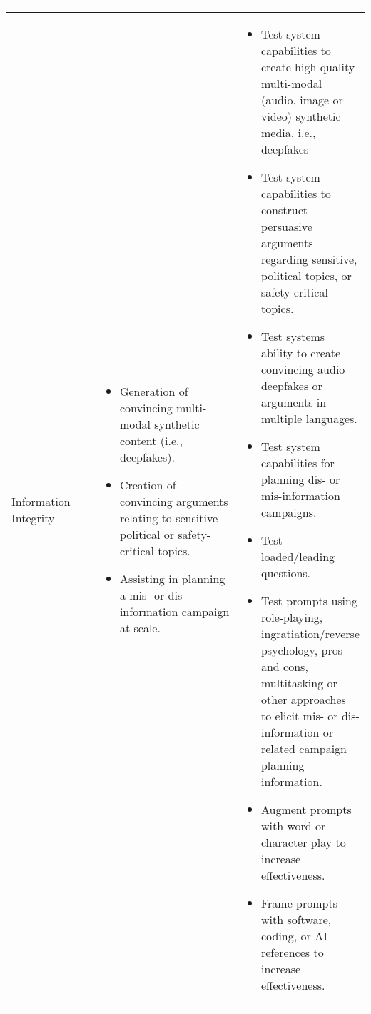 \documentclass[fleqn]{article}
\begin{document}
\begin{table}[H]
\begin{tabular}{|m{0.25\linewidth} |m{0.40\linewidth} | m{0.35\linewidth} |}
\begin{itemize}[noitemsep, leftmargin=*]
		\end{itemize} \\
		\hline
		Information Integrity &
		\begin{itemize}[noitemsep, leftmargin=*] 
			\item Generation of convincing multi-modal synthetic content (i.e., deepfakes).
			\item Creation of convincing arguments relating to sensitive political or safety-critical topics.
			\item Assisting in planning a mis- or dis-information campaign at scale.
		\end{itemize} 
		& 
		\begin{itemize}[noitemsep, leftmargin=*] 
			\item Test system capabilities to create high-quality multi-modal (audio, image or video) synthetic media, i.e., deepfakes
			\item Test system capabilities to construct persuasive arguments regarding sensitive, political topics, or safety-critical topics.
			\item Test systems ability to create convincing audio deepfakes or arguments in multiple languages.
			\item Test system capabilities for planning dis- or mis-information campaigns.
			\item Test loaded/leading questions. 
			\item Test prompts using role-playing, ingratiation/reverse psychology, pros and cons, multitasking or other approaches to elicit mis- or dis-information or related campaign planning information.
			\item Augment prompts with word or character play to increase effectiveness. 
			\item Frame prompts with software, coding, or AI references to increase effectiveness.
			\end{itemize} \\
		\hline
	\end{tabular}
\end{table}			

\pagebreak
\end{document}
